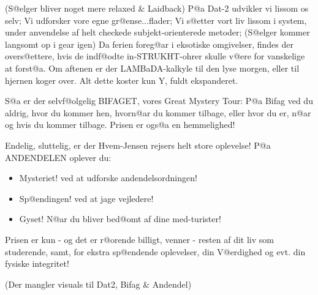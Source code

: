 \documentclass[a4paper,11pt]{article}
\begin{document}
\begin{sketch}
(S@elger bliver noget mere relaxed \& Laidback) P@a Dat-2 udvikler vi
lissom os selv; Vi udforsker vore egne gr@ense...flader; Vi s@etter
vort liv lissom i system, under anvendelse af helt checkede
subjekt-orienterede metoder; (S@elger kommer langsomt op i gear igen)
Da ferien foreg@ar i eksotiske omgivelser, findes der overs@ettere,
hvis de indf@odte in-STRUKHT-ohrer skulle v@ere for vanskelige at
forst@a. Om aftenen er der LAMBaDA-kalkyle til den lyse morgen, eller
til hjernen koger over. Alt dette koster kun Y, fuldt ekspanderet.

S@a er der selvf@olgelig BIFAGET, vores Great Mystery Tour: P@a Bifag
ved du aldrig, hvor du kommer hen, hvorn@ar du kommer tilbage, eller
hvor du er, n@ar og hvis du kommer tilbage. Prisen er ogs@a en
hemmelighed!

Endelig, sluttelig, er der Hvem-Jensen rejsers helt store oplevelse!
P@a ANDENDELEN oplever du:
\begin{itemize}
\item Mysteriet! ved at udforske andendelsordningen!
\item	Sp@endingen! ved at jage vejledere!
\item	Gyset! N@ar du bliver bed@omt af dine med-turister!
\end{itemize}
Prisen er kun - og det er r@orende billigt, venner - resten af dit liv
som studerende, samt, for ekstra sp@endende oplevelser, din V@erdighed
og evt. din fysiske integritet!

(Der mangler visuals til Dat2, Bifag \& Andendel)


\end{sketch}
\end{document}
